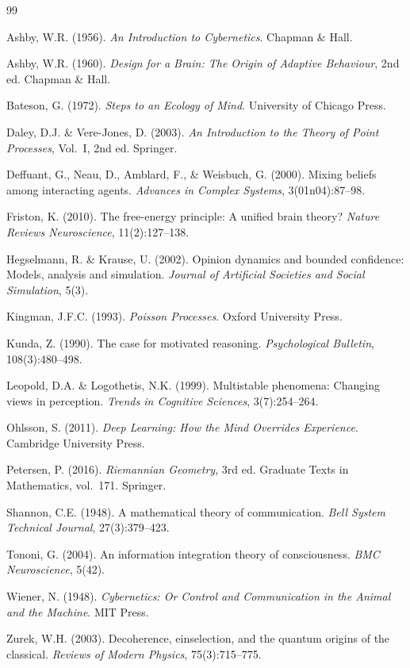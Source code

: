 \documentclass[11pt]{article}
\theoremstyle{plain}
\begin{document}
\begin{thebibliography}{99}

Ashby, W.R. (1956). \emph{An Introduction to Cybernetics}. Chapman \& Hall.

Ashby, W.R. (1960). \emph{Design for a Brain: The Origin of Adaptive Behaviour}, 2nd ed. Chapman
\& Hall.

Bateson, G. (1972). \emph{Steps to an Ecology of Mind}. University of Chicago Press.

Daley, D.J. \& Vere-Jones, D. (2003). \emph{An Introduction to the Theory of Point Processes},
Vol.~I, 2nd ed. Springer.

Deffuant, G., Neau, D., Amblard, F., \& Weisbuch, G. (2000). Mixing beliefs among interacting
agents. \emph{Advances in Complex Systems}, 3(01n04):87--98.

Friston, K. (2010). The free-energy principle: A unified brain theory? \emph{Nature Reviews
Neuroscience}, 11(2):127--138.

Hegselmann, R. \& Krause, U. (2002). Opinion dynamics and bounded confidence: Models, analysis and
simulation. \emph{Journal of Artificial Societies and Social Simulation}, 5(3).

Kingman, J.F.C. (1993). \emph{Poisson Processes}. Oxford University Press.

Kunda, Z. (1990). The case for motivated reasoning. \emph{Psychological Bulletin},
108(3):480--498.

Leopold, D.A. \& Logothetis, N.K. (1999). Multistable phenomena: Changing views in perception.
\emph{Trends in Cognitive Sciences}, 3(7):254--264.

Ohlsson, S. (2011). \emph{Deep Learning: How the Mind Overrides Experience}. Cambridge University
Press.

Petersen, P. (2016). \emph{Riemannian Geometry}, 3rd ed. Graduate Texts in Mathematics, vol.~171.
Springer.

Shannon, C.E. (1948). A mathematical theory of communication. \emph{Bell System Technical
Journal}, 27(3):379--423.

Tononi, G. (2004). An information integration theory of consciousness. \emph{BMC Neuroscience},
5(42).

Wiener, N. (1948). \emph{Cybernetics: Or Control and Communication in the Animal and the Machine}.
MIT Press.

Zurek, W.H. (2003). Decoherence, einselection, and the quantum origins of the classical.
\emph{Reviews of Modern Physics}, 75(3):715--775.

\end{thebibliography}
\end{document}
